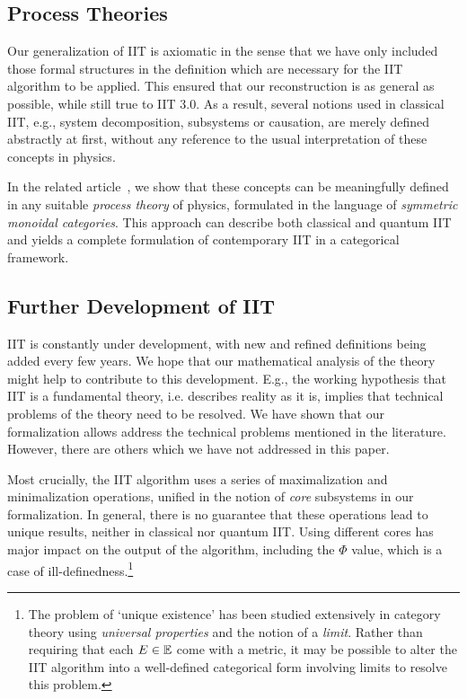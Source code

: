\subsection{Process Theories}
Our generalization of IIT is axiomatic in the sense that we have only included those formal structures in the definition which are necessary for the IIT algorithm to be applied. This ensured that our reconstruction is as general as possible, while still true to IIT 3.0. As a result, several notions used in classical IIT, e.g., system decomposition, subsystems or causation, are merely defined abstractly at first, without any reference to the usual interpretation of these concepts in physics.

In the related article~\cite{IITProcess}, we show that these concepts can be meaningfully defined in any suitable \emph{process theory} of physics, formulated in the language of \emph{symmetric monoidal categories}. This approach can describe both classical and quantum IIT and yields a complete formulation of contemporary IIT in a categorical framework. 

\subsection{Further Development of IIT}
IIT is constantly under development, with new and refined definitions being added every few years. We hope that our mathematical analysis of the theory might help to contribute to this development. E.g., the working hypothesis that IIT is a fundamental theory, i.e. describes reality as it is, implies that technical problems of the theory need to be resolved. We have shown that our formalization allows address the technical problems mentioned in the literature. However, there are others which we have not addressed in this paper.

Most crucially, the IIT algorithm uses a series of maximalization and minimalization operations, unified in the notion of \emph{core} subsystems in our formalization. In general, there is no guarantee that these operations lead to unique results, neither in classical nor quantum IIT. Using different cores has major impact on the output of the algorithm, including the $\Phi$ value, which is a case of ill-definedness.\footnote{The problem of `unique existence' has been studied extensively in category theory using \emph{universal properties} and the notion of a \emph{limit}. Rather than requiring that each $E \in \mathbb{E}$ come with a metric, it may be possible to alter the IIT algorithm into a well-defined categorical form involving limits to resolve this problem.}

